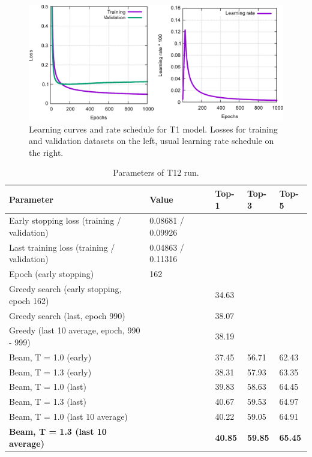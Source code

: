\documentclass{article}
\begin{document}
\begin{figure}[h!]
  \centering
  \includegraphics[width = 16.5cm]{images/t12.pdf}
  \caption{Learning curves and rate schedule for T1 model. Losses for training and validation datasets on the left, usual learning rate schedule on the right.}
  \label{fig:t11}
\end{figure}

\begin{table}[h!]
\caption{Parameters of T12 run.}
  \centering
  \begin{tabular}{p{6.2cm}p{3.5cm}p{1.5cm}p{1.5cm}p{1.5cm}}
    \toprule
    Parameter & Value & Top-1 & Top-3 & Top-5 \\
    \midrule
    Early stopping loss (training / validation) &  0.08681 / 0.09926 & & & \\
    Last training loss (training / validation) &  0.04863 / 0.11316  & & & \\
    Epoch (early stopping) & 162 & & & \\
    \midrule
    Greedy search (early stopping, epoch 162) &  & 34.63 & &\\
    Greedy search (last, epoch 990) &  & 38.07  & & \\
    Greedy (last 10 average, epoch, 990 - 999) & & 38.19 & & \\
    \midrule
    Beam, T = 1.0 (early) & & 37.45 & 56.71 & 62.43 \\
    Beam, T = 1.3 (early) & & 38.31 & 57.93 & 63.35 \\ 
    \midrule
    Beam, T = 1.0 (last) & & 39.83 & 58.63 &  64.45 \\
    Beam, T = 1.3 (last) & & 40.67 &  59.53 & 64.97 \\ 
    \midrule
    Beam, T = 1.0 (last 10 average) & & 40.22 & 59.05 &  64.91 \\
    \textbf{Beam, T = 1.3 (last 10 average)} & & \textbf{40.85} &  \textbf{59.85} & \textbf{65.45} \\ 
    \bottomrule
  \end{tabular}
  \label{tbl:t12}

\end{table} 
\end{document}
